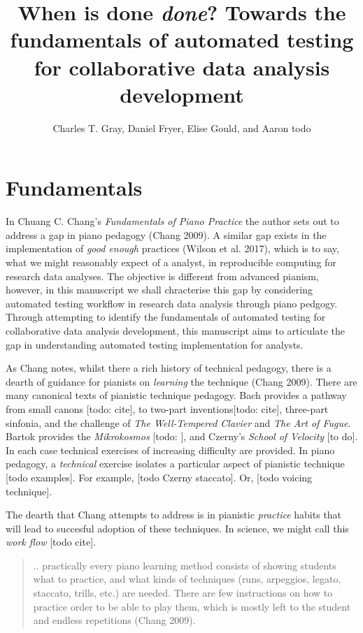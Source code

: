 \documentclass[
]{article}
\title{When is done \emph{done}? Towards the fundamentals of automated
testing for collaborative data analysis development}
\author{Charles T. Gray, Daniel Fryer, Elise Gould, and Aaron todo}
\date{}
\begin{document}
\maketitle

\hypertarget{fundamentals}{%
\section{Fundamentals}\label{fundamentals}}

In Chuang C. Chang's \emph{Fundamentals of Piano Practice} the author
sets out to address a gap in piano pedagogy (Chang 2009). A similar gap
exists in the implementation of \emph{good enough} practices (Wilson et
al. 2017), which is to say, what we might reasonably expect of a
analyst, in reproducible computing for research data analyses. The
objective is different from advanced pianism, however, in this
manuscript we shall chracterise this gap by considering automated
testing workflow in research data analysis through piano pedgogy.
Through attempting to identify the fundamentals of automated testing for
collaborative data analysis development, this manuscript aims to
articulate the gap in understanding automated testing implementation for
analysts.

As Chang notes, whilst there a rich history of technical pedagogy, there
is a dearth of guidance for pianists on \emph{learning} the technique
(Chang 2009). There are many canonical texts of pianistic technique
pedagogy. Bach provides a pathway from small canons {[}todo: cite{]}, to
two-part inventions{[}todo: cite{]}, three-part sinfonia, and the
challenge of \emph{The Well-Tempered Clavier} and \emph{The Art of
Fugue}. Bartok provides the \emph{Mikrokosmos} {[}todo: {]}, and
Czerny's \emph{School of Velocity} {[}to do{]}. In each case technical
exercises of increasing difficulty are provided. In piano pedagogy, a
\emph{technical} exercise isolates a particular aspect of pianistic
technique {[}todo examples{]}. For example, {[}todo Czerny staccato{]}.
Or, {[}todo voicing technique{]}.

The dearth that Chang attempts to address is in pianistic
\emph{practice} habits that will lead to succesful adoption of these
techniques. In science, we might call this \emph{work flow} {[}todo
cite{]}.

\begin{quote}
.. practically every piano learning method consists of showing students
what to practice, and what kinds of techniques (runs, arpeggios, legato,
staccato, trills, etc.) are needed. There are few instructions on how to
practice order to be able to play them, which is mostly left to the
student and endless repetitions (Chang 2009).
\end{quote}
\end{document}
